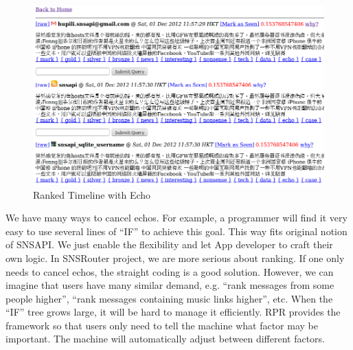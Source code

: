 \documentclass{sig-alternate}
\begin{document}
\begin{figure}
	\centering
	\includegraphics[width=0.9\linewidth]{../pic/echo_ranked_timeline_before.png}
	\caption{Ranked Timeline with Echo}
	\label{fig:echo_ranked_timeline_before}
\end{figure}

We have many ways to cancel echos. 
For example, a programmer will find it very easy 
to use several lines of ``IF'' to achieve this goal. 
This way fits original notion of SNSAPI. 
We just enable the flexibility and let App developer to craft their own logic. 
In SNSRouter project, we are more serious about ranking. 
If one only needs to cancel echos, the straight coding is a good solution. 
However, we can imagine that users have many similar demand, 
e.g. ``rank messages from some people higher'', 
``rank messages containing music links higher'', etc. 
When the ``IF'' tree grows large, it will be hard to manage it efficiently. 
RPR provides the framework so that users only need to tell 
the machine what factor may be important. 
The machine will automatically adjust between different factors. 

\end{document}
